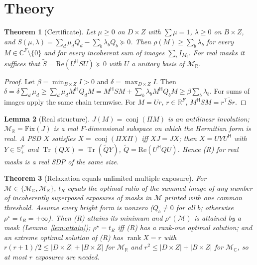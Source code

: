 \documentclass[11pt,a4paper]{article}
\newtheorem{theorem}{Theorem}\newtheorem{lemma}[theorem]{Lemma}\newtheorem{proposition}[theorem]{Proposition}
\theoremstyle{remark}\newtheorem*{remark}{Remark}
\newcommand{\R}{\mathbb{R}}\newcommand{\C}{\mathbb{C}}\newcommand{\PSD}{\succeq 0}
\DeclareMathOperator{\Tr}{Tr}\DeclareMathOperator{\rank}{rank}\DeclareMathOperator{\conj}{conj}
\newcommand{\I}{I}\newcommand{\rhostar}{\rho^{\star}}\newcommand{\NA}{\mathrm{NA}}\newcommand{\EL}{\mathrm{EL}}
\begin{document}
\section{Theory}\label{sec:theory}
\begin{theorem}[Certificate]\label{thm:cert}
Let $\mu\ge0$ on $D\times Z$ with $\sum\mu=1$, $\lambda\ge0$ on $B\times Z$, and $S(\mu,\lambda)=\sum_d\mu_dQ_d-\sum_b\lambda_bQ_b\PSD$. Then $\rho(M)\ge\sum_b\lambda_b$ for every $M\in\C^F\setminus\{0\}$ and for every incoherent sum of images $\sum_i\I_{M_i}$. For real masks it suffices that $\tilde S=\mathrm{Re}(U^{\mathsf H}SU)\PSD$ with $U$ a unitary basis of $\mathcal M_\R$.
\end{theorem}
\begin{proof}
Let $\beta=\min_{B\times Z}\I>0$ and $\delta=\max_{D\times Z}\I$. Then $\delta=\delta\sum_d\mu_d\ge\sum_d\mu_dM^{\mathsf H}Q_dM=M^{\mathsf H}SM+\sum_b\lambda_bM^{\mathsf H}Q_bM\ge\beta\sum_b\lambda_b$. For sums of images apply the same chain termwise. For $M=Ur$, $r\in\R^F$, $M^{\mathsf H}SM=r^{\mathsf T}\tilde Sr$.
\end{proof}
\begin{lemma}[Real structure]\label{lem:real}
$J(M)=\conj(\Pi M)$ is an antilinear involution; $\mathcal M_\R=\mathrm{Fix}(J)$ is a real $F$-dimensional subspace on which the Hermitian form is real. A PSD $X$ satisfies $X=\conj(\Pi X\Pi)$ iff $XJ=JX$; then $X=UYU^{\mathsf H}$ with $Y\in\mathbb S^F_+$ and $\Tr(QX)=\Tr(\tilde QY)$, $\tilde Q=\mathrm{Re}(U^{\mathsf H}QU)$. Hence (R) for real masks is a real SDP of the same size.
\end{lemma}
\begin{theorem}[Relaxation equals unlimited multiple exposure]\label{thm:me}
For $\mathcal M\in\{\mathcal M_\C,\mathcal M_\R\}$, $t_R$ equals the optimal ratio of the summed image of any number of incoherently superposed exposures of masks in $\mathcal M$ printed with one common threshold. Assume every bright form is nonzero ($Q_b\ne0$ for all $b$; otherwise $\rhostar=t_R=+\infty$). Then (R) attains its minimum and $\rhostar(\mathcal M)$ is attained by a mask (Lemma~\ref{lem:attain}); $\rhostar=t_R$ iff (R) has a rank-one optimal solution; and an extreme optimal solution of (R) has $\rank X=r$ with $r(r+1)/2\le|D\times Z|+|B\times Z|$ for $\mathcal M_\R$ and $r^2\le|D\times Z|+|B\times Z|$ for $\mathcal M_\C$, so at most $r$ exposures are needed.
\end{theorem}
\end{document}
